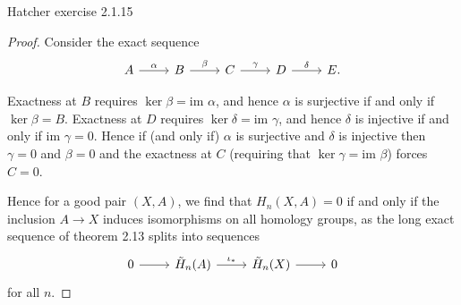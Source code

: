 \documentclass{../../mathnotes}
\begin{document}
\begin{prop}
    Hatcher exercise 2.1.15
\end{prop}
\begin{proof}
    Consider the exact sequence
    \begin{equation*}
        \begin{tikzcd}
            A\ar{r}{\alpha}&B\ar{r}{\beta}&C\ar{r}{\gamma}&D\ar{r}{\delta}&E.
        \end{tikzcd}
    \end{equation*}

    Exactness at $B$ requires $\ker\beta=\text{im }\alpha$, and hence $\alpha$ is surjective if and only
    if $\ker\beta=B$. Exactness at $D$ requires $\ker\delta=\text{im }\gamma$, and hence $\delta$ is injective
    if and only if $\text{im }\gamma=0$.
    Hence if (and only if) $\alpha$ is surjective and $\delta$ is injective then $\gamma=0$ and $\beta=0$ and the exactness at $C$
    (requiring that $\ker\gamma=\text{im }\beta$) forces $C=0$.

    Hence for a good pair $(X,A)$, we find that $H_n(X,A)=0$ if and only if the inclusion $A\to X$ induces
    isomorphisms on all homology groups, as the long exact sequence of theorem 2.13 splits into sequences
    \begin{equation*}
        \begin{tikzcd}
            0\ar{r}&\tilde H_n(A)\ar{r}{\iota_*}&\tilde H_n(X)\ar{r}&0
        \end{tikzcd}
    \end{equation*}
    for all $n$.
\end{proof}
\end{document}
